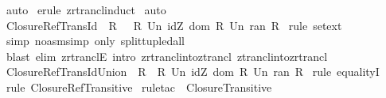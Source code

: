 \begin{isabellebody}
%
\isadelimproof
%
\endisadelimproof
%
\isatagproof
{}\isamarkupfalse%
\ auto\isanewline
{}\isamarkupfalse%
\ {\isacharparenleft}erule\ zrtrancl{\isacharunderscore}induct{\isacharparenright}\isanewline
{}\isamarkupfalse%
\ auto\isanewline
{}\isamarkupfalse%
%
\endisatagproof
{\isafoldproof}%
%
\isadelimproof
\isanewline
%
\endisadelimproof
\isanewline
{}\isamarkupfalse%
\ Closure{\isacharunderscore}RefTrans{\isacharunderscore}Id\ {\isacharcolon}\ {\isachardoublequoteopen}{\isacharparenleft}R{\isacharpercent}{\isacharasterisk}\ {\isacharparenright}\ {\isacharequal}\ {\isacharparenleft}{\isacharparenleft}R{\isacharpercent}{\isacharplus}{\isacharparenright}\ Un\ {\isacharparenleft}idZ\ {\isacharparenleft}dom\ R\ Un\ ran\ R{\isacharparenright}{\isacharparenright}{\isacharparenright}{\isachardoublequoteclose}\isanewline
%
\isadelimproof
%
\endisadelimproof
%
\isatagproof
{}\isamarkupfalse%
\ {\isacharparenleft}rule\ set{\isacharunderscore}ext{\isacharparenright}\isanewline
{}\isamarkupfalse%
\ {\isacharparenleft}simp\ {\isacharparenleft}no{\isacharunderscore}asm{\isacharunderscore}simp{\isacharparenright}\ only{\isacharcolon}\ split{\isacharunderscore}tupled{\isacharunderscore}all{\isacharparenright}\isanewline
{}\isamarkupfalse%
\ {\isacharparenleft}blast\ elim{\isacharcolon}\ zrtranclE\ intro{\isacharcolon}\ zrtrancl{\isacharunderscore}into{\isacharunderscore}ztrancl{}\ ztrancl{\isacharunderscore}into{\isacharunderscore}zrtrancl{\isacharparenright}\isanewline
{}\isamarkupfalse%
%
\endisatagproof
{\isafoldproof}%
%
\isadelimproof
\isanewline
%
\endisadelimproof
\isanewline
\isanewline
{}\isamarkupfalse%
\ Closure{\isacharunderscore}RefTrans{\isacharunderscore}Id{\isacharunderscore}Union\ {\isacharcolon}\ {\isachardoublequoteopen}R{\isacharpercent}{\isacharasterisk}\ {\isacharequal}\ {\isacharparenleft}R\ Un\ idZ\ {\isacharparenleft}dom\ R\ Un\ ran\ R{\isacharparenright}{\isacharparenright}{\isacharpercent}{\isacharplus}{\isachardoublequoteclose}\isanewline
%
\isadelimproof
%
\endisadelimproof
%
\isatagproof
{}\isamarkupfalse%
\ {\isacharparenleft}rule\ equalityI{\isacharparenright}\isanewline
{}\isamarkupfalse%
\ {\isacharparenleft}rule\ Closure{\isacharunderscore}RefTransitive{\isacharparenright}\isanewline
{}\isamarkupfalse%
\ {\isacharparenleft}rule{\isacharunderscore}tac\ {\isacharbrackleft}{}{\isacharbrackright}\ Closure{\isacharunderscore}Transitive{\isacharparenright}\isanewline

\end{isabellebody}
